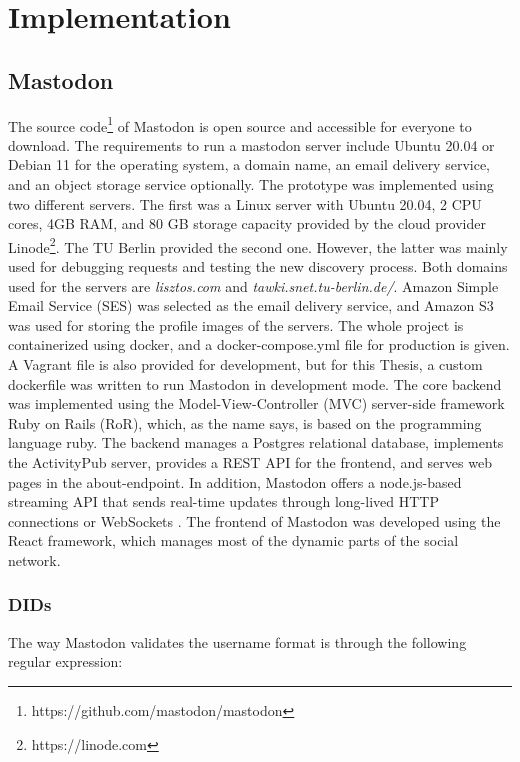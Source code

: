 \chapter{Implementation}
\label{cha:implementation}

\section{Mastodon}

The source code\footnote{https://github.com/mastodon/mastodon} of Mastodon is open source and accessible for everyone to download. The requirements to run a mastodon server include Ubuntu 20.04 or Debian 11 for the operating system, a domain name, an email delivery service, and an object storage service optionally. The prototype was implemented using two different servers. The first was a Linux server with Ubuntu 20.04, 2 CPU cores,  4GB RAM, and 80 GB storage capacity provided by the cloud provider Linode\footnote{https://linode.com}. The TU Berlin provided the second one. However, the latter was mainly used for debugging requests and testing the new discovery process. Both domains used for the servers are \emph{lisztos.com} and \emph{tawki.snet.tu-berlin.de/}. Amazon Simple Email Service (SES) was selected as the email delivery service, and Amazon S3 was used for storing the profile images of the servers. The whole project is containerized using docker, and a docker-compose.yml file for production is given. A Vagrant file is also provided for development, but for this Thesis, a custom dockerfile was written to run Mastodon in development mode. The core backend was implemented using the Model-View-Controller (MVC) server-side framework Ruby on Rails (RoR), which, as the name says, is based on the programming language ruby. The backend manages a Postgres relational database, implements the ActivityPub server, provides a REST API for the frontend, and serves web pages in the about-endpoint. In addition, Mastodon offers a node.js-based streaming API that sends real-time updates through long-lived HTTP connections or WebSockets \cite{rochko_2020}. The frontend of Mastodon was developed using the React framework, which manages most of the dynamic parts of the social network.

\subsection{DIDs}

The way Mastodon validates the username format is through the following regular expression: 

